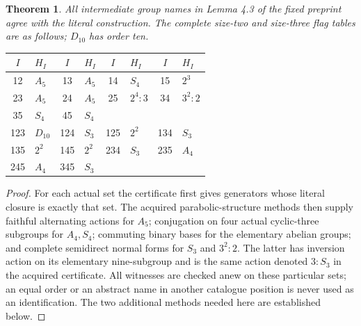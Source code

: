 \documentclass[11pt]{article}
\newtheorem{theorem}{Theorem}\newtheorem{lemma}[theorem]{Lemma}
\begin{document}
\begin{theorem}
All intermediate group names in Lemma 4.3 of the fixed preprint agree
with the literal construction. The complete size-two and size-three
flag tables are as follows; $D_{10}$ has order ten.
\end{theorem}
\begin{center}\small
\begin{tabular}{@{}cl@{\quad}cl@{\quad}cl@{\quad}cl@{}}
\toprule $I$&$H_I$&$I$&$H_I$&$I$&$H_I$&$I$&$H_I$\\\midrule
12&$A_5$&13&$A_5$&14&$S_4$&15&$2^3$\\
23&$A_5$&24&$A_5$&25&$2^4:3$&34&$3^2:2$\\
35&$S_4$&45&$S_4$&&&&\\\midrule
123&$D_{10}$&124&$S_3$&125&$2^2$&134&$S_3$\\
135&$2^2$&145&$2^2$&234&$S_3$&235&$A_4$\\
245&$A_4$&345&$S_3$&&&&\\\bottomrule
\end{tabular}
\end{center}
\begin{proof}
For each actual set the certificate first gives generators whose literal
closure is exactly that set. The acquired parabolic-structure methods
then supply faithful alternating actions for $A_5$; conjugation on four
actual cyclic-three subgroups for $A_4,S_4$; commuting binary bases for
the elementary abelian groups; and complete semidirect normal forms for
$S_3$ and $3^2:2$. The latter has inversion action on its elementary
nine-subgroup and is the same action denoted $3:S_3$ in the acquired
certificate. All witnesses are checked anew on these particular sets;
an equal order or an abstract name in another catalogue position is
never used as an identification. The two additional methods needed
here are established below.
\end{proof}
\end{document}

